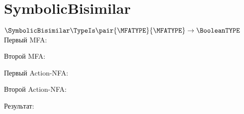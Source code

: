 \section{SymbolicBisimilar}
\begin{frame}{$\SymbolicBisimilar\TypeIs\pair{\MFATYPE}{\MFATYPE}\to\BooleanTYPE$}
	Первый MFA:


	Второй MFA:


    Первый Action-NFA:


    Второй Action-NFA:


	Результат:


\end{frame}